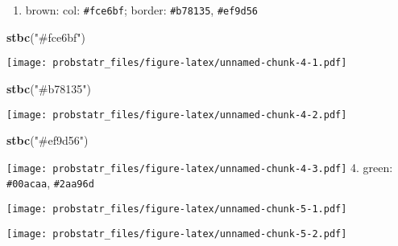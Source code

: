 \documentclass[]{ctexbook}
\newenvironment{Shaded}{\begin{snugshade}}{\end{snugshade}}
\newcommand{\KeywordTok}[1]{\textcolor[rgb]{0.13,0.29,0.53}{\textbf{#1}}}
\newcommand{\NormalTok}[1]{#1}
\newcommand{\StringTok}[1]{\textcolor[rgb]{0.31,0.60,0.02}{#1}}
\providecommand{\tightlist}{%
  \setlength{\itemsep}{0pt}\setlength{\parskip}{0pt}}
\begin{document}
\begin{enumerate}
\def\labelenumi{\arabic{enumi}.}
\setcounter{enumi}{2}
\tightlist
\item
  brown: col: \texttt{\#fce6bf}; border: \texttt{\#b78135},
  \texttt{\#ef9d56}
\end{enumerate}

\begin{Shaded}
\begin{Highlighting}[]
\KeywordTok{stbc}\NormalTok{(}\StringTok{"#fce6bf"}\NormalTok{)}
\end{Highlighting}
\end{Shaded}

\texttt{[image: probstatr\_files/figure-latex/unnamed-chunk-4-1.pdf]}

\begin{Shaded}
\begin{Highlighting}[]
\KeywordTok{stbc}\NormalTok{(}\StringTok{"#b78135"}\NormalTok{)}
\end{Highlighting}
\end{Shaded}

\texttt{[image: probstatr\_files/figure-latex/unnamed-chunk-4-2.pdf]}

\begin{Shaded}
\begin{Highlighting}[]
\KeywordTok{stbc}\NormalTok{(}\StringTok{"#ef9d56"}\NormalTok{)}
\end{Highlighting}
\end{Shaded}

\texttt{[image: probstatr\_files/figure-latex/unnamed-chunk-4-3.pdf]} 4.
green: \texttt{\#00acaa}, \texttt{\#2aa96d}

\begin{Shaded}
\end{Shaded}

\texttt{[image: probstatr\_files/figure-latex/unnamed-chunk-5-1.pdf]}

\begin{Shaded}
\end{Shaded}

\texttt{[image: probstatr\_files/figure-latex/unnamed-chunk-5-2.pdf]}
\end{document}
